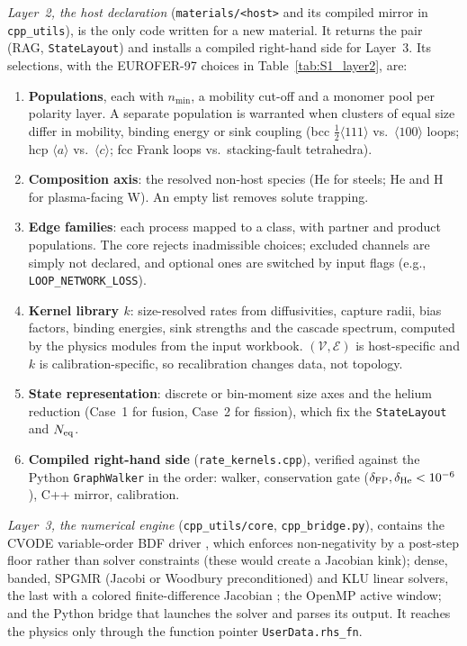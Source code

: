 \emph{Layer~2, the host declaration} (\texttt{materials/<host>} and its
compiled mirror in \texttt{cpp\_utils}), is the only code written for a
new material. It returns the pair (RAG, \texttt{StateLayout}) and installs
a compiled right-hand side for Layer~3. Its selections, with the EUROFER-97
choices in Table~\ref{tab:S1_layer2}, are:
\begin{enumerate}
\item \textbf{Populations}, each with $n_{\min}$, a mobility cut-off and a
  monomer pool per polarity layer. A separate population is warranted when
  clusters of equal size differ in mobility, binding energy or sink
  coupling (bcc $\tfrac12\langle111\rangle$ vs.\ $\langle100\rangle$ loops;
  hcp $\langle a\rangle$ vs.\ $\langle c\rangle$; fcc Frank loops vs.\
  stacking-fault tetrahedra).
\item \textbf{Composition axis}: the resolved non-host species (He for
  steels; He and H for plasma-facing W). An empty list removes solute
  trapping.
\item \textbf{Edge families}: each process mapped to a class, with partner
  and product populations. The core rejects inadmissible choices; excluded
  channels are simply not declared, and optional ones are switched by input
  flags (e.g., \texttt{LOOP\_NETWORK\_LOSS}).
\item \textbf{Kernel library $k$}: size-resolved rates from diffusivities,
  capture radii, bias factors, binding energies, sink strengths and the
  cascade spectrum, computed by the physics modules from the input
  workbook. $(\mathcal{V},\mathcal{E})$ is host-specific and $k$ is
  calibration-specific, so recalibration changes data, not topology.
\item \textbf{State representation}: discrete or bin-moment size axes and
  the helium reduction (Case~1 for fusion, Case~2 for fission), which fix
  the \texttt{StateLayout} and $N_{\rm eq}$.
\item \textbf{Compiled right-hand side} (\texttt{rate\_kernels.cpp}),
  verified against the Python \texttt{GraphWalker} in the order: walker,
  conservation gate ($\delta_{\rm FP},\delta_{\rm He}<10^{-6}$), C++
  mirror, calibration.
\end{enumerate}

\emph{Layer~3, the numerical engine} (\texttt{cpp\_utils/core},
\texttt{cpp\_bridge.py}), contains the CVODE variable-order BDF driver
\cite{Hindmarsh2005,Gardner2022}, which enforces non-negativity by a
post-step floor rather than solver constraints (these would create a
Jacobian kink); dense, banded, SPGMR \cite{SaadSchultz1986} (Jacobi or
Woodbury preconditioned) and KLU \cite{DavisKLU2010} linear solvers, the
last with a colored finite-difference Jacobian \cite{CPR1974}; the OpenMP
active window; and the Python bridge that launches the solver and parses
its output. It reaches the physics only through the function pointer
\texttt{UserData.rhs\_fn}.

